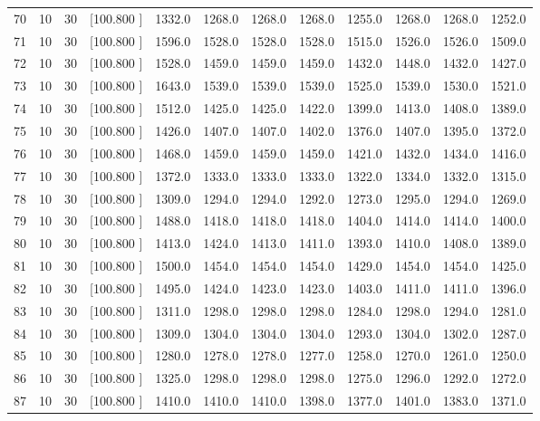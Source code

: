 \documentclass[12pt,a4paper]{article}
\begin{document}
\begin{center}
{\begin{tabular}{r r r r r r r r r r r r}
  70& 10& 30&[100.800   ]&  1332.0&  1268.0&  1268.0&  1268.0&  1255.0&  1268.0&  1268.0&  1252.0\\[-0.02in]
  71& 10& 30&[100.800   ]&  1596.0&  1528.0&  1528.0&  1528.0&  1515.0&  1526.0&  1526.0&  1509.0\\[-0.02in]
  72& 10& 30&[100.800   ]&  1528.0&  1459.0&  1459.0&  1459.0&  1432.0&  1448.0&  1432.0&  1427.0\\[-0.02in]
  73& 10& 30&[100.800   ]&  1643.0&  1539.0&  1539.0&  1539.0&  1525.0&  1539.0&  1530.0&  1521.0\\[-0.02in]
  74& 10& 30&[100.800   ]&  1512.0&  1425.0&  1425.0&  1422.0&  1399.0&  1413.0&  1408.0&  1389.0\\[-0.02in]
  75& 10& 30&[100.800   ]&  1426.0&  1407.0&  1407.0&  1402.0&  1376.0&  1407.0&  1395.0&  1372.0\\[-0.02in]
  76& 10& 30&[100.800   ]&  1468.0&  1459.0&  1459.0&  1459.0&  1421.0&  1432.0&  1434.0&  1416.0\\[-0.02in]
  77& 10& 30&[100.800   ]&  1372.0&  1333.0&  1333.0&  1333.0&  1322.0&  1334.0&  1332.0&  1315.0\\[-0.02in]
  78& 10& 30&[100.800   ]&  1309.0&  1294.0&  1294.0&  1292.0&  1273.0&  1295.0&  1294.0&  1269.0\\[-0.02in]
  79& 10& 30&[100.800   ]&  1488.0&  1418.0&  1418.0&  1418.0&  1404.0&  1414.0&  1414.0&  1400.0\\[-0.02in]
  80& 10& 30&[100.800   ]&  1413.0&  1424.0&  1413.0&  1411.0&  1393.0&  1410.0&  1408.0&  1389.0\\[-0.02in]
  81& 10& 30&[100.800   ]&  1500.0&  1454.0&  1454.0&  1454.0&  1429.0&  1454.0&  1454.0&  1425.0\\[-0.02in]
  82& 10& 30&[100.800   ]&  1495.0&  1424.0&  1423.0&  1423.0&  1403.0&  1411.0&  1411.0&  1396.0\\[-0.02in]
  83& 10& 30&[100.800   ]&  1311.0&  1298.0&  1298.0&  1298.0&  1284.0&  1298.0&  1294.0&  1281.0\\[-0.02in]
  84& 10& 30&[100.800   ]&  1309.0&  1304.0&  1304.0&  1304.0&  1293.0&  1304.0&  1302.0&  1287.0\\[-0.02in]
  85& 10& 30&[100.800   ]&  1280.0&  1278.0&  1278.0&  1277.0&  1258.0&  1270.0&  1261.0&  1250.0\\[-0.02in]
  86& 10& 30&[100.800   ]&  1325.0&  1298.0&  1298.0&  1298.0&  1275.0&  1296.0&  1292.0&  1272.0\\[-0.02in]
  87& 10& 30&[100.800   ]&  1410.0&  1410.0&  1410.0&  1398.0&  1377.0&  1401.0&  1383.0&  1371.0\\[-0.02in]

\end{tabular}}
\end{center}
\end{document}
